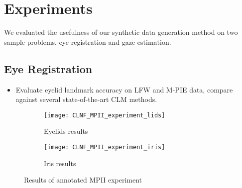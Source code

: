 
\section{Experiments}

We evaluated the usefulness of our synthetic data generation method on two sample problems, eye registration and gaze estimation.


\subsection{Eye Registration}


\begin{itemize}
    \item Evaluate eyelid landmark accuracy on LFW and M-PIE data, compare against several state-of-the-art CLM methods.
\end{itemize}

\begin{figure}
    \centering
    \begin{subfigure}[t]{0.48\columnwidth}
        \texttt{[image: CLNF\_MPII\_experiment\_lids]}
        \caption{Eyelids results}
    \end{subfigure}%
    \hfill
    \begin{subfigure}[t]{0.48\columnwidth}
        \texttt{[image: CLNF\_MPII\_experiment\_iris]}
        \caption{Iris results}
    \end{subfigure}
    \caption{Results of annotated MPII experiment}
    \label{fig:clnf_results}
\end{figure}


